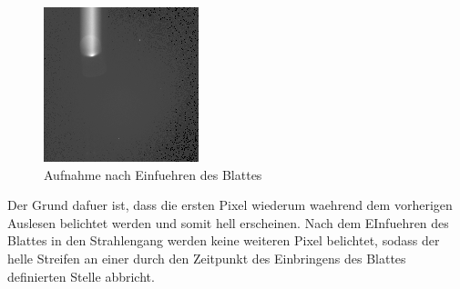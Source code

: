 \begin{figure}[h!]
        \includegraphics[width=.4\textwidth]{smear_oben_frueh.png}
\caption{ Aufnahme nach Einfuehren des Blattes }
\label{fig:smear3}
\end{figure}
Der Grund dafuer ist, dass die ersten Pixel wiederum waehrend dem vorherigen Auslesen belichtet werden und somit hell erscheinen. Nach dem EInfuehren des Blattes in den Strahlengang werden keine weiteren Pixel belichtet, sodass der helle Streifen an einer durch den Zeitpunkt des Einbringens des Blattes definierten Stelle abbricht. 
